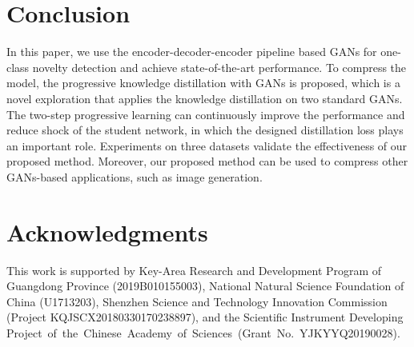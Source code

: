 \documentclass{article}
\begin{document}
	
\section{Conclusion}
	In this paper, we use the encoder-decoder-encoder pipeline based GANs for one-class novelty detection and achieve state-of-the-art performance. To compress the model, the progressive knowledge distillation with GANs is proposed, which is a novel exploration that applies the knowledge distillation on two standard GANs. The two-step progressive learning can continuously improve the performance and reduce shock of the student network, in which the designed distillation loss plays an important role. Experiments on three datasets validate the effectiveness of our proposed method. Moreover, our proposed method can be used to compress other GANs-based applications, such as image generation.
	
	\section*{Acknowledgments}
	This work is supported by Key-Area Research and Development Program of Guangdong Province (2019B010155003), National Natural Science Foundation of China (U1713203), Shenzhen Science and Technology Innovation Commission (Project KQJSCX20180330170238897), and the Scientific  Instrument  Developing Project of the Chinese Academy of Sciences (Grant No. YJKYYQ20190028).
	
	

	
	
\end{document}

